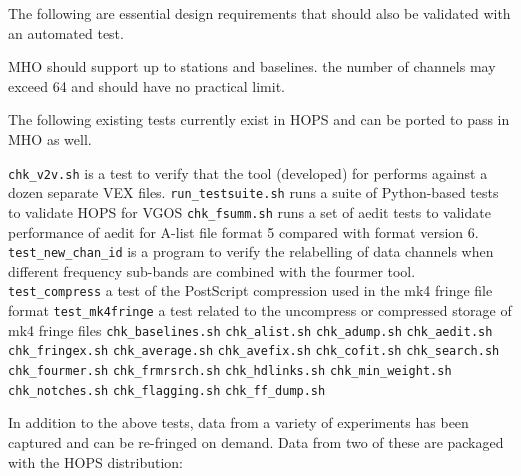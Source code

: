 The following are essential design requirements that should also
be validated with an automated test.

\begin{description}
 \ac{MHO} should support up to
     stations and  baselines.
 the number of \acs{channels} may exceed 64 and should
    have no practical limit.
\end{description}

The following existing tests currently exist in \ac{HOPS}
and can be ported to pass in \ac{MHO} as well.

\begin{description}
 \texttt{chk\_v2v.sh} is a test to verify that the 
    tool (developed) for  performs against a dozen separate
    \acs{VEX} files.
 \texttt{run\_testsuite.sh} runs a suite of \ac{Python}-based
    tests to validate \ac{HOPS} for \ac{VGOS}
 \texttt{chk\_fsumm.sh} runs a set of \ac{aedit} tests
    to validate performance of \ac{aedit} for \ac{A-list} file
    format 5 compared with format version 6.
 \texttt{test\_new\_chan\_id} is a program to verify the
    relabelling of data channels when different frequency sub-bands
    are combined with the \acs{fourmer} tool.
 \texttt{test\_compress} a test of the \ac{PostScript}
    compression used in the \ac{mk4} fringe file format
 \texttt{test\_mk4fringe} a test related to the uncompress
    or compressed storage of \ac{mk4} fringe files
 \texttt{chk\_baselines.sh}
 \texttt{chk\_alist.sh}
 \texttt{chk\_adump.sh}
 \texttt{chk\_aedit.sh}
 \texttt{chk\_fringex.sh}
 \texttt{chk\_average.sh}
 \texttt{chk\_avefix.sh}
 \texttt{chk\_cofit.sh}
 \texttt{chk\_search.sh}
 \texttt{chk\_fourmer.sh}
 \texttt{chk\_frmrsrch.sh}
 \texttt{chk\_hdlinks.sh}
 \texttt{chk\_min\_weight.sh}
 \texttt{chk\_notches.sh}
 \texttt{chk\_flagging.sh}
 \texttt{chk\_ff\_dump.sh}
\end{description}

In addition to the above tests, data from a variety of experiments
has been captured and can be re-fringed on demand.  Data from two of
these are packaged with the \ac{HOPS} distribution:

